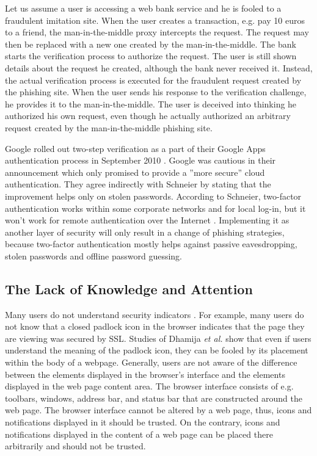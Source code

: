 \documentclass[english,gradu]{tktltiki}
\begin{document}
             Let us assume a user is accessing a web bank service and he is fooled to a fraudulent imitation site. When the user creates a transaction, e.g. pay 10 euros to a friend, the man-in-the-middle proxy intercepts the request. The request may then be replaced with a new one created by the man-in-the-middle. The bank starts the verification process to authorize the request. The user is still shown details about the request he created, although the bank never received it. Instead, the actual verification process is executed for the fraudulent request created by the phishing site. When the user sends his response to the verification challenge, he provides it to the man-in-the-middle. The user is deceived into thinking he authorized his own request, even though he actually authorized an arbitrary request created by the man-in-the-middle phishing site.

             Google rolled out two-step verification as a part of their Google Apps authentication process in September 2010 \cite{google_2step_2010}. Google was cautious in their announcement which only promised to provide a ''more secure'' cloud authentication. They agree indirectly with Schneier \cite{schneier_2factor_2005} by stating that the improvement helps only on stolen passwords. According to Schneier, two-factor authentication works within some corporate networks and for local log-in, but it won't work for remote authentication over the Internet \cite{schneier_2factor_2005}. Implementing it as another layer of security will only result in a change of phishing strategies, because two-factor authentication mostly helps against passive eavesdropping, stolen passwords and offline password guessing.


          \subsection{The Lack of Knowledge and Attention}

              Many users do not understand security indicators \cite{why_phishing_works_06}. For example, many users do not know that a closed padlock icon in the browser indicates that the page they are viewing was secured by SSL. Studies of Dhamija \emph{et al.} \cite{why_phishing_works_06} show that even if users understand the meaning of the padlock icon, they can be fooled by its placement within the body of a webpage. Generally, users are not aware of the difference between the elements displayed in the browser's interface and the elements displayed in the web page content area. The browser interface consists of e.g. toolbars, windows, address bar, and status bar that are constructed around the web page. The browser interface cannot be altered by a web page, thus, icons and notifications displayed in it should be trusted. On the contrary, icons and notifications displayed in the content of a web page can be placed there arbitrarily and should not be trusted.
\end{document}
